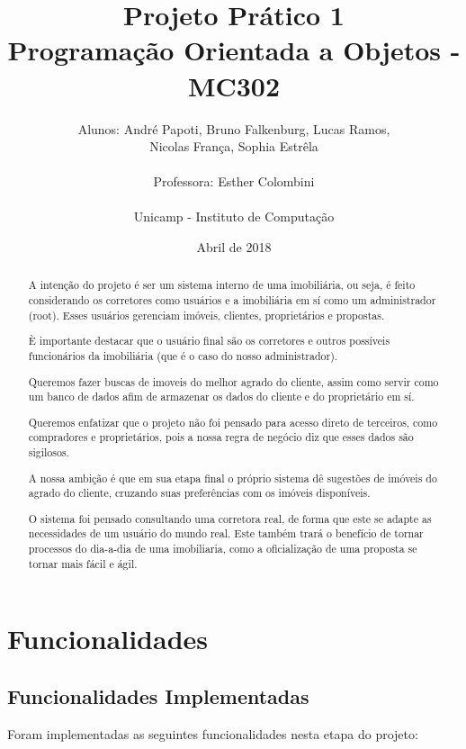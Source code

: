 \documentclass[a4paper,11pt,fleqn]{article}
\title{Projeto Prático 1\\
Programação Orientada a Objetos - MC302}
\author{Alunos: André Papoti, Bruno Falkenburg, Lucas Ramos, \\
Nicolas França, Sophia Estrêla\\\\
Professora: Esther Colombini\\\\
Unicamp - Instituto de Computação\\}
\date{Abril de 2018}
\begin{document}
\maketitle

\begin{abstract}
\noindent

A intenção do projeto é ser um sistema interno de uma imobiliária, ou seja, é feito considerando os corretores como usuários e a imobiliária em sí como um administrador (root). Esses usuários gerenciam imóveis, clientes, proprietários e propostas.

È importante destacar que o usuário final são os corretores e outros possíveis funcionários da imobiliária (que é o caso do nosso administrador).

Queremos fazer buscas de imoveis do melhor agrado do cliente, assim como servir como um banco de dados afim de armazenar os dados do cliente e do proprietário em sí.

Queremos enfatizar que o projeto não foi pensado para acesso direto de terceiros, como compradores e proprietários, pois a nossa regra de negócio diz que esses dados são sigilosos.

A nossa ambição é que em sua etapa final o próprio sistema dê sugestões de imóveis do agrado do cliente, cruzando suas preferências com os imóveis disponíveis.

O sistema foi pensado consultando uma corretora real, de forma que este se adapte as necessidades de um usuário do mundo real. Este também trará o benefício de tornar processos do dia-a-dia de uma imobiliaria, como a oficialização de uma proposta se tornar mais fácil e ágil.

\end{abstract}

\section{Funcionalidades}
\label{s:funcionalidades}

\subsection{Funcionalidades Implementadas}
\label{ss:func-impl}


Foram implementadas as seguintes funcionalidades nesta etapa do projeto:
\end{document}
